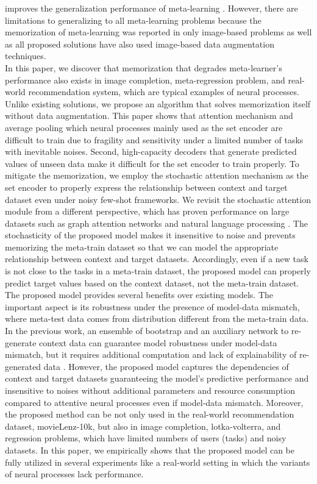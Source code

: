 improves the generalization performance of meta-learning
\cite{Rajendran2020meta, yao2020improving}. However, there are limitations to
generalizing to all meta-learning problems because the memorization of
meta-learning was reported in only image-based problems as well as all proposed
solutions have also used image-based data augmentation techniques. \\
In this paper, we discover that memorization that degrades meta-learner's performance also exists in image completion, meta-regression problem, and real-world recommendation system, which are typical examples of neural processes. Unlike existing solutions, we propose an algorithm that solves memorization itself without data augmentation. 
This paper shows that attention mechanism and average pooling which neural processes mainly used as the set encoder are difficult to train due to fragility and sensitivity under a limited number of tasks with inevitable noises. Second, high-capacity decoders that generate predicted values of unseen data make it difficult for the set encoder to train properly. To mitigate the memorization, we employ the stochastic attention mechanism as the set encoder to properly express the relationship between context and target dataset even under noisy few-shot frameworks. We revisit the stochastic attention module from a different perspective, which has proven performance on large datasets such as graph attention networks and natural language processing \cite{Fan2020bayesian}. The stochasticity of the proposed model makes it insensitive to noise and prevents memorizing the meta-train dataset so that we can model the appropriate relationship between context and target datasets. Accordingly, even if a new task is not close to the tasks in a meta-train dataset, the proposed model can properly predict target values based on the context dataset, not the meta-train dataset. The proposed model provides several benefits over existing models. The important aspect is its robustness under the presence of model-data mismatch, where meta-test data comes from distribution different from the meta-train data. In the previous work, an ensemble of bootstrap and an auxiliary network to re-generate context data can guarantee model robustness under model-data mismatch, but it requires additional computation and lack of explainability of re-generated data \cite{lee2020bootstrapping}. However, the proposed model captures the dependencies of context and target datasets guaranteeing the model's predictive performance and insensitive to noises without additional parameters and resource consumption compared to attentive neural processes \cite{kim2019attentive} even if model-data mismatch. Moreover, the proposed method can be not only used in the real-world recommendation dataset, movieLenz-10k, but also in image completion, lotka-volterra, and regression problems, which have limited numbers of users (tasks) and noisy datasets. In this paper, we empirically shows that the proposed model can be fully utilized in several experiments like a real-world setting in which the variants of neural processes lack performance.


